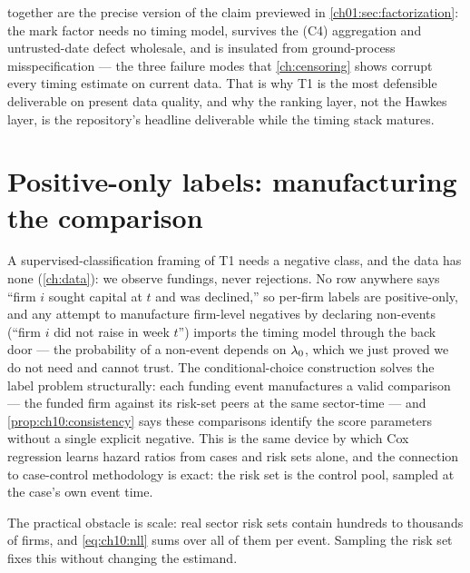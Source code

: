  together are the precise
version of the claim previewed in \cref{ch01:sec:factorization}: the mark
factor needs no timing model, survives the (C4) aggregation and
untrusted-date defect wholesale, and is insulated from ground-process
misspecification --- the three failure modes that \cref{ch:censoring}
shows corrupt every timing estimate on current data. That is why T1 is
the most defensible deliverable on present data quality, and why the
ranking layer, not the Hawkes layer, is the repository's headline
deliverable while the timing stack matures.

\section{Positive-only labels: manufacturing the comparison}\label{ch10:sec:positive}

A supervised-classification framing of T1 needs a negative class, and the
data has none (\cref{ch:data}): we observe fundings, never rejections. No
row anywhere says ``firm $i$ sought capital at $t$ and was declined,'' so
per-firm labels are positive-only, and any attempt to manufacture
firm-level negatives by declaring non-events (``firm $i$ did not raise in
week $t$'') imports the timing model through the back door --- the
probability of a non-event depends on $\lambda_0$, which we just proved we
do not need and cannot trust. The conditional-choice construction solves
the label problem structurally: each funding event manufactures a valid
comparison --- the funded firm against its risk-set peers at the same
sector-time --- and \cref{prop:ch10:consistency} says these comparisons
identify the score parameters without a single explicit negative. This is
the same device by which Cox regression learns hazard ratios from cases
and risk sets alone, and the connection to case-control methodology is
exact: the risk set is the control pool, sampled at the case's own event
time.

The practical obstacle is scale: real sector risk sets contain hundreds
to thousands of firms, and \cref{eq:ch10:nll} sums over all of them per
event. Sampling the risk set fixes this without changing the estimand.


